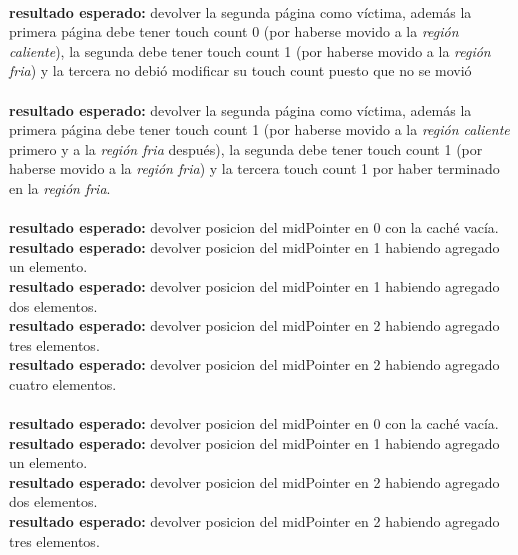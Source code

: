 \documentclass[11pt, a4paper, spanish]{article}
\begin{document}
\\
\textbf{resultado esperado:} devolver la segunda p\'agina como v\'ictima, además la primera p\'agina debe tener touch count 0 (por haberse movido
a la \textit{regi\'on caliente}), la segunda debe tener touch count 1 (por haberse movido a la \textit{regi\'on fria}) y la tercera no debi\'o
modificar su touch count puesto que no se movi\'o\\

\\
\textbf{resultado esperado:} devolver la segunda p\'agina como v\'ictima, además la primera p\'agina debe tener touch count 1 (por haberse movido
a la \textit{regi\'on caliente} primero y a la \textit{regi\'on fria} despu\'es), la segunda debe tener touch count 1 (por haberse movido a la 
\textit{regi\'on fria}) y la tercera touch count 1 por haber terminado en la  \textit{regi\'on fria}.\\

\\
\textbf{resultado esperado:} devolver posicion del midPointer en 0 con la cach\'e vac\'ia.\\
\textbf{resultado esperado:} devolver posicion del midPointer en 1 habiendo agregado un elemento.\\
\textbf{resultado esperado:} devolver posicion del midPointer en 1 habiendo agregado dos elementos.\\
\textbf{resultado esperado:} devolver posicion del midPointer en 2 habiendo agregado tres elementos.\\
\textbf{resultado esperado:} devolver posicion del midPointer en 2 habiendo agregado cuatro elementos.\\

\\
\textbf{resultado esperado:} devolver posicion del midPointer en 0 con la cach\'e vac\'ia.\\
\textbf{resultado esperado:} devolver posicion del midPointer en 1 habiendo agregado un elemento.\\
\textbf{resultado esperado:} devolver posicion del midPointer en 2 habiendo agregado dos elementos.\\
\textbf{resultado esperado:} devolver posicion del midPointer en 2 habiendo agregado tres elementos.\\
\end{document}
